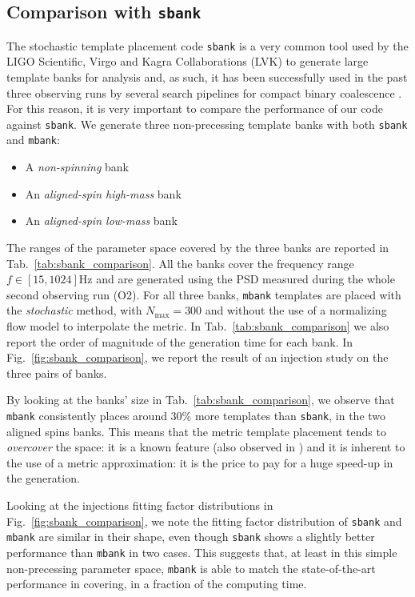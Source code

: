 \documentclass[twocolumn,showpacs,preprintnumbers,nofootinbib,prd,
superscriptaddress,10pt]{revtex4-2}
\begin{document}
\subsection{Comparison with \texttt{sbank} }\label{sec:sbank_comparison}

The stochastic template placement code \texttt{sbank} \cite{Ajith:2012mn} is a very common tool used by the LIGO Scientific, Virgo and Kagra Collaborations (LVK) to generate large template banks for analysis and, as such, it has been successfully used in the past three observing runs by several search pipelines for compact binary coalescence \cite{Usman:2015kfa, Mukherjee:2018yra, Aubin:2020goo}. For this reason, it is very important to compare the performance of our code against \texttt{sbank}.
We generate three non-precessing template banks with both \texttt{sbank} and \texttt{mbank}:
\begin{itemize}
	\item A {\it non-spinning} bank
	\item An {\it aligned-spin high-mass} bank
	\item An {\it aligned-spin low-mass} bank
\end{itemize}
The ranges of the parameter space covered by the three banks are reported in Tab.~\ref{tab:sbank_comparison}. All the banks cover the frequency range $f\in [15,1024] \text{Hz}$ and are generated using the PSD measured during the whole second observing run (O2).
For all three banks, \texttt{mbank} templates are placed with the {\it stochastic} method, with $N_\text{max}=300$ and without the use of a normalizing flow model to interpolate the metric. In Tab.~\ref{tab:sbank_comparison} we also report the order of magnitude of the generation time for each bank.
In Fig.~\ref{fig:sbank_comparison}, we report the result of an injection study on the three pairs of banks.

By looking at the banks' size in Tab.~\ref{tab:sbank_comparison}, we observe that \texttt{mbank} consistently places around 30\% more templates than \texttt{sbank}, in the two aligned spins banks. This means that the metric template placement tends to \textit{overcover} the space: it is a known feature (also observed in \cite{Coogan:2022qxs}) and it is inherent to the use of a metric approximation: it is the price to pay for a huge speed-up in the generation.

Looking at the injections fitting factor distributions in Fig.~\ref{fig:sbank_comparison}, we note the fitting factor distribution of \texttt{sbank} and \texttt{mbank} are similar in their shape, even though \texttt{sbank} shows a slightly better performance than \texttt{mbank} in two cases. This suggests that, at least in this simple non-precessing parameter space, \texttt{mbank} is able to match the state-of-the-art performance in covering, in a fraction of the computing time.
\end{document}
